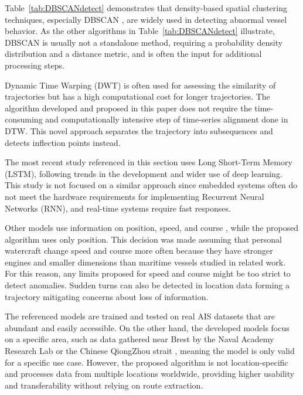 \documentclass[preprint,12pt]{elsarticle}
\begin{document}
Table~\ref{tab:DBSCANdetect} demonstrates that density-based spatial clustering techniques, especially DBSCAN \citep{Ester1996ADA}, are widely used in detecting abnormal vessel behavior. As the other algorithms in Table~\ref{tab:DBSCANdetect} illustrate, DBSCAN is usually not a standalone method, requiring a probability density distribution and a distance metric, and is often the input for additional processing steps.

Dynamic Time Warping (DWT) is often used for assessing the similarity of trajectories \cite{2017Fu, 2021Pedroche} but has a high computational cost for longer trajectories. The algorithm developed and proposed in this paper does not require the time-consuming and computationally intensive step of time-series alignment done in DTW. This novel approach separates the trajectory into subsequences and detects inflection points instead.

The most recent study referenced in this section \cite{2023Li} uses Long Short-Term Memory (LSTM), following trends in the development and wider use of deep learning. This study is not focused on a similar approach since embedded systems often do not meet the hardware requirements for implementing Recurrent Neural Networks (RNN), and real-time systems require fast responses.

Other models use information on position, speed, and course \cite{2014Wang, 2015Pallotta, 2018Lei, 2023Li}, while the proposed algorithm uses only position. This decision was made assuming that personal watercraft change speed and course more often because they have stronger engines and smaller dimensions than maritime vessels studied in related work. For this reason, any limits proposed for speed and course might be too strict to detect anomalies. Sudden turns can also be detected in location data forming a trajectory mitigating concerns about loss of information.

The referenced models are trained and tested on real AIS datasets \cite{2023Li, 2015Pallotta, 2017Fu} that are abundant and easily accessible. On the other hand, the developed models focus on a specific area, such as data gathered near Brest by the Naval Academy Research Lab \cite{2013Pallotta2} or the Chinese QiongZhou strait \cite{2018Lei}, meaning the model is only valid for a specific use case. However, the proposed algorithm is not location-specific and processes data from multiple locations worldwide, providing higher usability and transferability without relying on route extraction.
\end{document}
